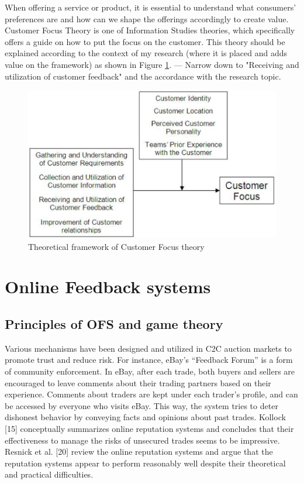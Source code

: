 When offering a service or product, it is essential to understand what consumers' preferences are and how can we shape the offerings accordingly to create value. Customer Focus Theory is one of Information Studies theories, which specifically offers a guide on how to put the focus on the customer. This theory should be explained according to the context of my research (where it is placed and adds value on the framework) as shown in Figure \ref{fig:CustomerFocus}. 
--- Narrow down to "Receiving and utilization of customer feedback" and the accordance with the research topic.

\begin{figure}[t!]
	\centering
	\includegraphics[height=0.3\textheight]{fig01/CustomerFocus}
	\caption{Theoretical framework of Customer Focus theory}
	\label{fig:CustomerFocus}
\end{figure}

\section{Online Feedback systems}
\label{sec:OFS}

\subsection{Principles of OFS and game theory}

Various mechanisms have been designed and utilized
in C2C auction markets to promote trust and reduce risk.
For instance,
eBay's “Feedback Forum” is a form of community enforcement.
In eBay, after each trade, both buyers and
sellers are encouraged to leave comments about their
trading partners based on their experience. Comments
about traders are kept under each trader's profile, and can
be accessed by everyone who visits eBay. This way, the
system tries to deter dishonest behavior by conveying
facts and opinions about past trades. Kollock [15]
conceptually summarizes online reputation systems and
concludes that their effectiveness to manage the risks of
unsecured trades seems to be impressive. Resnick et al.
[20] review the online reputation systems and argue that
the reputation systems appear to perform reasonably well
despite their theoretical and practical difficulties. \cite{yang2007effects}


